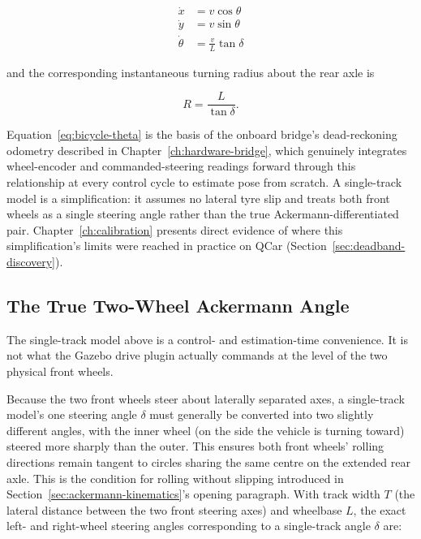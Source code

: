 \begin{align}
  \dot{x} &= v \cos\theta \label{eq:bicycle-x}\\
  \dot{y} &= v \sin\theta \label{eq:bicycle-y}\\
  \dot{\theta} &= \frac{v}{L}\tan\delta \label{eq:bicycle-theta}
\end{align}

and the corresponding instantaneous turning radius about the rear
axle is

\begin{equation}
  R = \frac{L}{\tan\delta}. \label{eq:bicycle-radius}
\end{equation}

Equation~\ref{eq:bicycle-theta} is the basis of the onboard bridge's
dead-reckoning odometry described in Chapter~\ref{ch:hardware-bridge},
which genuinely integrates wheel-encoder and commanded-steering
readings forward through this relationship at every control cycle to
estimate pose from scratch. A single-track model is a simplification: it assumes no lateral tyre
slip and treats both front wheels as a single steering angle rather
than the true Ackermann-differentiated pair. Chapter~\ref{ch:calibration}
presents direct evidence of where this simplification's limits were
reached in practice on QCar
(Section~\ref{sec:deadband-discovery}).

\subsection{The True Two-Wheel Ackermann Angle}
\label{sec:true-ackermann}

The single-track model above is a control- and estimation-time
convenience. It is not what the Gazebo drive plugin actually
commands at the level of the two physical front wheels.

Because the two front wheels steer about laterally separated axes, a
single-track model's one steering angle $\delta$ must generally be
converted into two slightly different angles, with the inner wheel
(on the side the vehicle is turning toward) steered more sharply than
the outer. This ensures both front wheels' rolling directions remain
tangent to circles sharing the same centre on the extended rear axle.
This is the condition for rolling without slipping introduced in
Section~\ref{sec:ackermann-kinematics}'s opening paragraph. With
track width $T$ (the lateral distance between
the two front steering axes) and wheelbase $L$, the exact left- and
right-wheel steering angles corresponding to a single-track angle
$\delta$ are:

